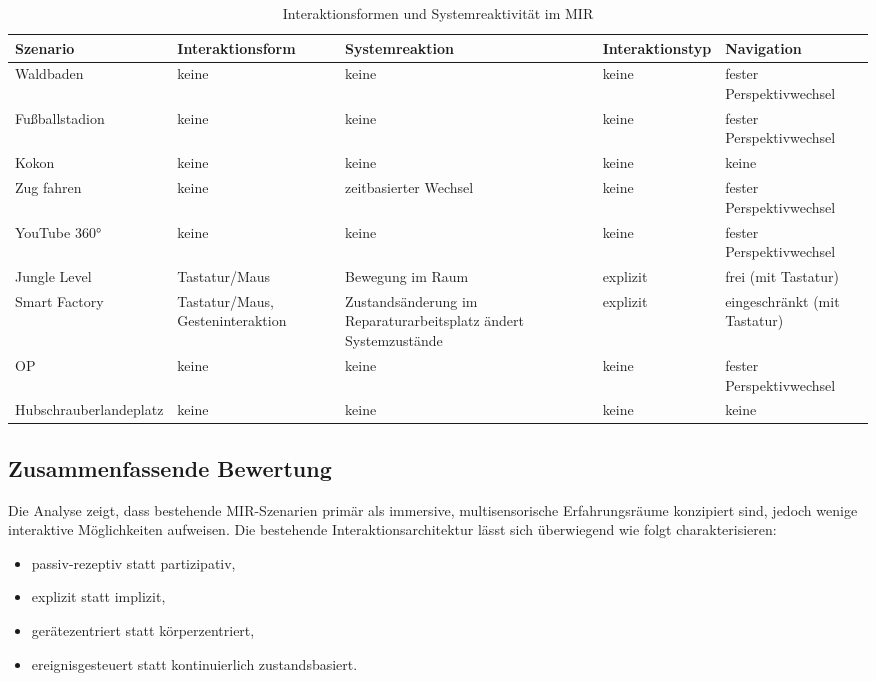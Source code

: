 \begin{table}[H]
    \centering
    \small
    \caption{Interaktionsformen und Systemreaktivität im MIR}
    \begin{tabular}{p{} p{3cm} >{\raggedright\arraybackslash}p{3cm} p{} >{\raggedright\arraybackslash}p{4cm}}
        \toprule
        \textbf{Szenario} & \textbf{Interaktions\-form} & \textbf{System\-reaktion} & \textbf{Inter\-aktions\-typ} & \textbf{Navigation}\\
        \midrule
        Waldbaden & keine & keine & keine & fester Pers\-pektiv\-wechsel \\
        Fußballstadion & keine & keine & keine & fester Pers\-pektiv\-wechsel \\
        Kokon & keine & keine & keine & keine \\
        Zug fahren & keine & zeitbasierter Wechsel & keine & fester Pers\-pektiv\-wechsel \\
        YouTube 360° & keine & keine & keine & fester Pers\-pektiv\-wechsel \\
        Jungle Level & Tasta\-tur/Maus & Bewegung im Raum & explizit & frei (mit Tasta\-tur) \\
        Smart Factory & Tasta\-tur/Maus, Gesteninteraktion & Zustands\-än\-der\-ung im Re\-pa\-ra\-tur\-ar\-beits\-platz ändert System\-zu\-stän\-de & explizit & eingeschränkt (mit Tasta\-tur) \\
        OP & keine & keine & keine & fester Pers\-pektiv\-wechsel \\
        Hubschrauber\-landeplatz & keine & keine & keine  & keine \\
        \bottomrule
    \end{tabular}
    \label{tab:interaktion}
\end{table}

\subsection{Zusammenfassende Bewertung}
Die Analyse zeigt, dass bestehende MIR-Szenarien primär als immersive, multisensorische Erfahrungsräume konzipiert sind, jedoch wenige interaktive Möglichkeiten aufweisen.
Die bestehende Interaktionsarchitektur lässt sich überwiegend wie folgt charakterisieren:
\begin{itemize}
\item passiv-rezeptiv statt partizipativ, %
\item explizit statt implizit,
\item gerätezentriert statt körperzentriert,
\item ereignisgesteuert statt kontinuierlich zustandsbasiert. %
\end{itemize}

